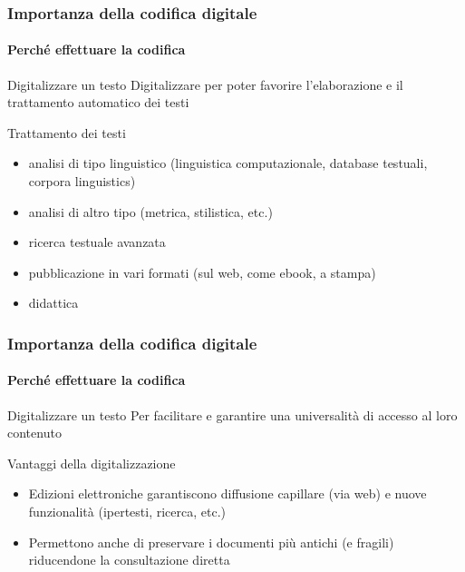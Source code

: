 
\begin{frame}
	\frametitle{Importanza della codifica digitale}
	\framesubtitle{Perché effettuare la codifica}
	\addtocounter{nframe}{1}

	\begin{block}{Digitalizzare un testo}
		Digitalizzare per poter favorire l'elaborazione e il trattamento automatico dei testi
	\end{block}

	\begin{block}{Trattamento dei testi}
		\begin{itemize}
			\item  analisi di tipo linguistico (linguistica computazionale,
			      database testuali, corpora linguistics)
			\item analisi di altro tipo (metrica, stilistica, etc.)
			\item ricerca testuale avanzata
			\item pubblicazione in vari formati (sul web, come ebook, a
			      stampa)
			\item didattica
		\end{itemize}

	\end{block}
\end{frame}

\begin{frame}
	\frametitle{Importanza della codifica digitale}
	\framesubtitle{Perché effettuare la codifica}
	\addtocounter{nframe}{1}

	\begin{block}{Digitalizzare un testo}
		Per facilitare e garantire una universalità di accesso al loro contenuto
	\end{block}

	\begin{block}{Vantaggi della digitalizzazione}
		\begin{itemize}
			\item Edizioni elettroniche garantiscono diffusione capillare
			      (via web) e nuove funzionalità (ipertesti, ricerca, etc.)
			\item Permettono anche di preservare i documenti più antichi
			      (e fragili) riducendone la consultazione diretta
		\end{itemize}
	\end{block}
\end{frame}

